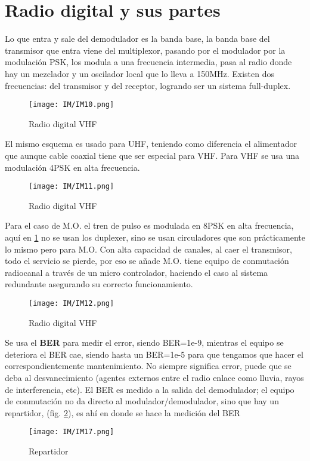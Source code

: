 \documentclass[
	12pt, %
	fleqn, %
	a4paper, %
	oneside, %
]{LegrandOrangeBook}
\begin{document}
\section{Radio digital y sus partes}
Lo que entra y sale del demodulador es la banda base, la banda base del transmisor que entra viene del multiplexor, pasando por el modulador por la modulación PSK, los modula a una frecuencia intermedia, pasa al radio donde hay un  mezclador y un oscilador local que lo lleva a 150MHz. Existen dos frecuencias: del transmisor y del receptor, logrando ser un sistema full-duplex.
\begin{figure}[H]
\centering
\texttt{[image: IM/IM10.png]}
\caption{Radio digital VHF}
\end{figure}
El mismo esquema es usado para UHF, teniendo como diferencia el alimentador que aunque cable coaxial tiene que ser especial para VHF. Para VHF se usa una modulación 4PSK en alta frecuencia.
\begin{figure}[H]
\centering
\texttt{[image: IM/IM11.png]}
\caption{Radio digital VHF}
\end{figure}
Para el caso de M.O. el tren de pulso es modulada en 8PSK en alta frecuencia, aquí en \ref{fig:mo} no se usan los duplexer, sino se usan circuladores que son prácticamente lo mismo pero para M.O. Con alta capacidad de canales, al caer el transmisor, todo el servicio se pierde, por eso se añade M.O. tiene equipo de conmutación radiocanal a través de un micro controlador, haciendo el caso al sistema redundante asegurando su correcto funcionamiento.
\begin{figure}[H]
\centering
\texttt{[image: IM/IM12.png]}
\caption{Radio digital VHF}
\label{fig:mo}
\end{figure}
Se usa el \textbf{BER} para medir el error, siendo BER=1e-9, mientras el equipo se deteriora el BER cae, siendo hasta un BER=1e-5 para que tengamos que hacer el correspondientemente mantenimiento. No siempre significa error, puede que se deba al desvanecimiento (agentes externos entre el radio enlace como lluvia, rayos de interferencia, etc). El BER es medido a la salida del demodulador; el equipo de conmutación no da directo al modulador/demodulador, sino que hay un repartidor,  (fig. \ref{fig:repartidor}), es ahí en donde se hace la medición del BER
\begin{figure}[H]
\centering
\texttt{[image: IM/IM17.png]}
\caption{Repartidor}
\label{fig:repartidor}
\end{figure}
\end{document}
